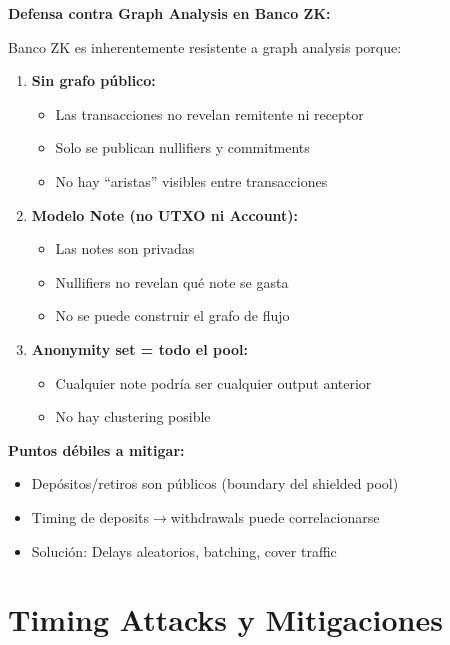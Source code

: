 \documentclass[11pt,a4paper,twoside]{book}
\begin{document}
\begin{bancozk}
\textbf{Defensa contra Graph Analysis en Banco ZK:}

Banco ZK es inherentemente resistente a graph analysis porque:

\begin{enumerate}
    \item \textbf{Sin grafo p\'ublico:}
    \begin{itemize}
        \item Las transacciones no revelan remitente ni receptor
        \item Solo se publican nullifiers y commitments
        \item No hay ``aristas'' visibles entre transacciones
    \end{itemize}
    
    \item \textbf{Modelo Note (no UTXO ni Account):}
    \begin{itemize}
        \item Las notes son privadas
        \item Nullifiers no revelan qu\'e note se gasta
        \item No se puede construir el grafo de flujo
    \end{itemize}
    
    \item \textbf{Anonymity set = todo el pool:}
    \begin{itemize}
        \item Cualquier note podr\'ia ser cualquier output anterior
        \item No hay clustering posible
    \end{itemize}
\end{enumerate}

\textbf{Puntos d\'ebiles a mitigar:}
\begin{itemize}
    \item Dep\'ositos/retiros son p\'ublicos (boundary del shielded pool)
    \item Timing de deposits$\to$withdrawals puede correlacionarse
    \item Soluci\'on: Delays aleatorios, batching, cover traffic
\end{itemize}
\end{bancozk}

\section{Timing Attacks y Mitigaciones}
\label{sec:timing-attacks}
\end{document}

